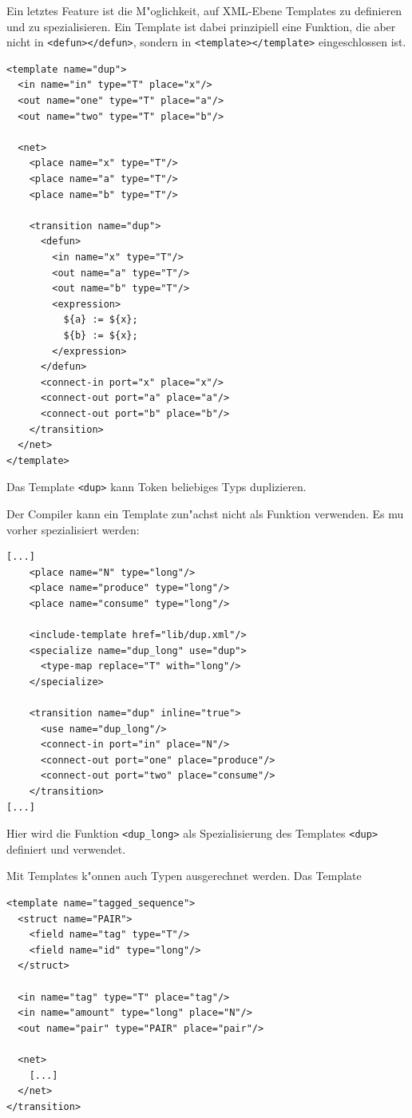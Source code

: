 \documentclass[a4paper,12pt]{article}
\newlength{\st}\setlength{\st}{0pt}
\newcommand{\element}[1]{\texttt{<#1>}}
\newcommand{\function}[1]{\texttt{<#1>}}
\begin{document}
Ein letztes Feature ist die M"oglichkeit, auf XML-Ebene Templates zu
definieren und zu spezialisieren. Ein Template ist dabei prinzipiell
eine Funktion, die aber nicht in \element{defun></defun}, sondern in
\element{template></template} eingeschlossen ist.
\begin{verbatim}
<template name="dup">
  <in name="in" type="T" place="x"/>
  <out name="one" type="T" place="a"/>
  <out name="two" type="T" place="b"/>

  <net>
    <place name="x" type="T"/>
    <place name="a" type="T"/>
    <place name="b" type="T"/>

    <transition name="dup">
      <defun>
        <in name="x" type="T"/>
        <out name="a" type="T"/>
        <out name="b" type="T"/>
        <expression>
          ${a} := ${x};
          ${b} := ${x};
        </expression>
      </defun>
      <connect-in port="x" place="x"/>
      <connect-out port="a" place="a"/>
      <connect-out port="b" place="b"/>
    </transition>
  </net>
</template>
\end{verbatim}

Das Template \function{dup} kann Token beliebiges Typs duplizieren.

Der Compiler kann ein Template zun"achst nicht als Funktion
verwenden. Es mu\3 vorher spezialisiert werden:

\begin{verbatim}
[...]
    <place name="N" type="long"/>
    <place name="produce" type="long"/>
    <place name="consume" type="long"/>

    <include-template href="lib/dup.xml"/>
    <specialize name="dup_long" use="dup">
      <type-map replace="T" with="long"/>
    </specialize>

    <transition name="dup" inline="true">
      <use name="dup_long"/>
      <connect-in port="in" place="N"/>
      <connect-out port="one" place="produce"/>
      <connect-out port="two" place="consume"/>
    </transition>
[...]
\end{verbatim}

Hier wird die Funktion \function{dup\_long} als Spezialisierung des
Templates \function{dup} definiert und verwendet.

Mit Templates k"onnen auch Typen ausgerechnet werden. Das Template
\begin{verbatim}
<template name="tagged_sequence">
  <struct name="PAIR">
    <field name="tag" type="T"/>
    <field name="id" type="long"/>
  </struct>

  <in name="tag" type="T" place="tag"/>
  <in name="amount" type="long" place="N"/>
  <out name="pair" type="PAIR" place="pair"/>

  <net>
    [...]
  </net>
</transition>
\end{verbatim}
\end{document}
